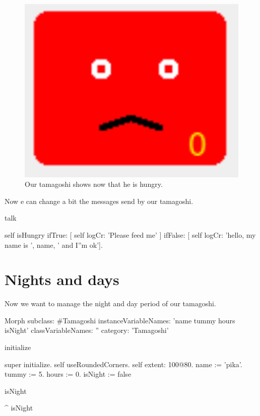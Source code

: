 \documentclass[a4paper,10pt,twoside]{book}
\begin{document}
\begin{figure}
\begin{center}
\includegraphics[width=12cm]{figures/hungry}
\caption{Our tamagoshi shows now that he is hungry.\label{withbtummy}}
\end{center}
\end{figure}

Now e can change a bit the messages send by our tamagoshi. 

\begin{code}{}
talk

	self isHungry
		ifTrue: [ self logCr: 'Please feed me' ]
		ifFalse: [ self logCr: 'hello, my name is ', name, ' and I''m ok'].
\end{code}


\section{Nights and days}
Now we want to manage the night and day period of our tamagoshi. 


\begin{code}{}
Morph subclass: #Tamagoshi
	instanceVariableNames: 'name tummy hours isNight'
	classVariableNames: ''
	category: 'Tamagoshi'
\end{code}

\begin{code}{}
initialize

	super initialize. 
	self useRoundedCorners.
	self extent: 100@80.
	name := 'pika'.
	tummy := 5.
	hours := 0.
	isNight := false
\end{code}

\begin{code}{}
isNight

	^ isNight
\end{code}
\end{document}
